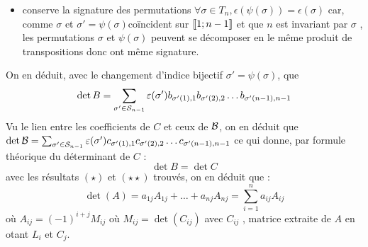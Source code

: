 \begin{dem}
\begin{itemize}
        \item  conserve la signature des permutations \ie \(\forall \sigma  \in T_n, \epsilon (\psi(\sigma )) = \epsilon(\sigma )\) car, comme \(\sigma\)  et \(\sigma ' = \psi(\sigma )\)coïncident sur \(\interventierii{1}{n-1}\) et que \(n\) est invariant par \(\sigma\) , les permutations \(\sigma\)  et \(\psi(\sigma )\) peuvent se décomposer en le même produit de transpositions donc ont même signature.
    \end{itemize}
    On en déduit, avec le changement d’indice bijectif \(\sigma ' = \psi(\sigma )\), que 
    \[\det B = \sum_{\sigma '\in\cal{S}_{n-1}}\epsilon(\sigma ')b_{\sigma '(1),1}b_{\sigma '(2),2} \dots b_{\sigma '(n-1),n-1}\]
    Vu le lien entre les coefficients de \(C\) et ceux de \(\cal{B}\), on en déduit que \(\det \cal{B} = \sum_{\sigma '\in\cal{S}_{n-1}} \epsilon(\sigma ')c_{\sigma '(1),1}c_{\sigma '(2),2} \dots c_{\sigma '(n-1),n-1}\) ce qui donne, par formule théorique du déterminant de \(C\) :
    \[\det B = \det C\]
    \conclusion avec les résultats \((\star)\) et \((\star\star)\) trouvés, on en déduit que :
    \[\det(A) = a_{1j} A_{1j} + \dots + a_{nj} A_{nj} = \sum^n_{i=1} a_{ij} A_{ij} \]
    où \(A_{ij} = (-1)^{i+j} M_{ij}\) où \(M_{ij} = \det (C_{ij} )\) avec \(C_{ij}\) , matrice extraite de \(A\) en otant \(L_i\) et \(C_j\).
\end{dem}

